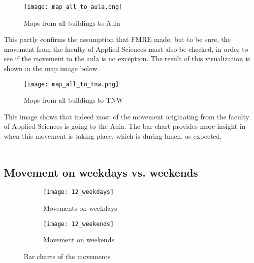 \begin{figure}[H]
\centering
\texttt{[image: map\_all\_to\_aula.png]}
\captionsetup{justification=centering}
\caption{Maps from all buildings to Aula}
\label{figure:all to aula maps}
\end{figure}

This partly confirms the assumption that FMRE made, but to be sure, the movement from the faculty of Applied Sciences must also be checked, in order to see if the movement to the aula is no exception. The result of this visualization is shown in the map image below.

\begin{figure}[H]
\centering
\texttt{[image: map\_all\_to\_tnw.png]}
\captionsetup{justification=centering}
\caption{Maps from all buildings to TNW}
\label{figure:all to TNW maps}
\end{figure} 

This image shows that indeed most of the movement originating from the faculty of Applied Sciences is going to the Aula. The bar chart provides more insight in when this movement is taking place, which is during lunch, as expected. 
\\\\
\subsection{Movement on weekdays vs. weekends}
\begin{figure}[H]
	\centering
	\captionsetup[subfigure]{justification=centering}
	\begin{subfigure}[t]{0.48\textwidth}
	\texttt{[image: 12\_weekdays]}
	\caption{Movements on weekdays}
	\label{figure:weekdays}
	\end{subfigure}
	\begin{subfigure}[t]{0.48\textwidth}
	\texttt{[image: 12\_weekends]}
	\caption{Movement on weekends}
	\label{figure:weekends}
	\end{subfigure}
	\captionsetup{justification=centering}
	\caption{Bar charts of the movements}
\end{figure}

